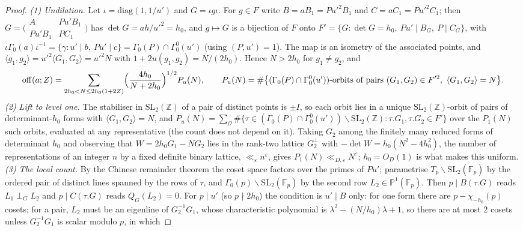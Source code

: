 \documentclass[11pt,a4paper]{article}
\newcommand{\Z}{\mathbb{Z}}\newcommand{\R}{\mathbb{R}}\newcommand{\Off}{\mathrm{Off}}\newcommand{\e}{\mathrm{e}}
\newcommand{\F}{\mathbb F}
\begin{document}
\begin{proof}
\emph{(1) Undilation.} Let $\iota=\mathrm{diag}(1,1/u')$ and $G=\iota g\iota$. For $g\in F$ write $B=aB_1=Pu'^2B_1$ and $C=aC_1=Pu'^2C_1$; then
$G=\bigl(\begin{smallmatrix}A&Pu'B_1\\Pu'B_1&PC_1\end{smallmatrix}\bigr)$ has $\det G=ah/u'^2=h_0$, and $g\mapsto G$ is a bijection of $F$ onto
$F'=\{G:\det G=h_0,\ Pu'\mid B_G,\ P\mid C_G\}$, with $\iota\Gamma_0(a)\iota^{-1}=\{\gamma:u'\mid b,\ Pu'\mid c\}=\Gamma_0(P)\cap\Gamma_0^0(u')$ (using $(P,u')=1$). The map is an
isometry of the associated points, and $\langle g_1,g_2\rangle=u'^2\langle G_1,G_2\rangle=u'^2N$ with $1+2u(g_1,g_2)=N/(2h_0)$. Hence $N>2h_0$ for $g_1\ne g_2$, and
\[
\mathrm{off}(a;Z)=\sum_{2h_0<N\le2h_0(1+2Z)}\Bigl(\frac{4h_0}{N+2h_0}\Bigr)^{1/2}P_u(N),\qquad P_u(N)=\#\bigl\{(\Gamma_0(P)\cap\Gamma_0^0(u'))\text{-orbits of pairs }(G_1,G_2)\in F'^2,\ \langle G_1,G_2\rangle=N\bigr\}.
\]
\emph{(2) Lift to level one.} The stabiliser in $\mathrm{SL}_2(\Z)$ of a pair of distinct points is $\pm I$, so each orbit lies in a unique $\mathrm{SL}_2(\Z)$-orbit of pairs
of determinant-$h_0$ forms with $\langle G_1,G_2\rangle=N$, and $P_u(N)=\sum_{\mathcal O}\#\{\tau\in(\Gamma_0(P)\cap\Gamma_0^0(u'))\backslash\mathrm{SL}_2(\Z):\tau.G_1,\tau.G_2\in F'\}$
over the $P_1(N)$ such orbits, evaluated at any representative (the count does not depend on it). Taking $G_2$ among the finitely many reduced forms of determinant $h_0$ and observing
that $W=2h_0G_1-NG_2$ lies in the rank-two lattice $G_2^\perp$ with $-\det W=h_0(N^2-4h_0^2)$, the number of representations of an integer $n$ by a fixed definite binary lattice,
$\ll_\varepsilon n^{\varepsilon}$, gives $P_1(N)\ll_{D,\varepsilon}N^{\varepsilon}$; $h_0=O_D(1)$ is what makes this uniform.
\emph{(3) The local count.} By the Chinese remainder theorem the coset space factors over the primes of $Pu'$; parametrise $T_p\backslash\mathrm{SL}_2(\F_p)$ by the ordered pair of
distinct lines spanned by the rows of $\tau$, and $\Gamma_0(p)\backslash\mathrm{SL}_2(\F_p)$ by the second row $L_2\in\mathbb P^1(\F_p)$. Then $p\mid B(\tau.G)$ reads $L_1\perp_GL_2$
and $p\mid C(\tau.G)$ reads $Q_G(L_2)=0$. For $p\mid u'$ (so $p\nmid2h_0$) the condition is $u'\mid B$ only: for one form there are $p-\chi_{-h_0}(p)$ cosets; for a pair, $L_2$ must
be an eigenline of $G_2^{-1}G_1$, whose characteristic polynomial is $\lambda^2-(N/h_0)\lambda+1$, so there are at most $2$ cosets unless $G_2^{-1}G_1$ is scalar modulo $p$, in which

\end{proof}
\end{document}
